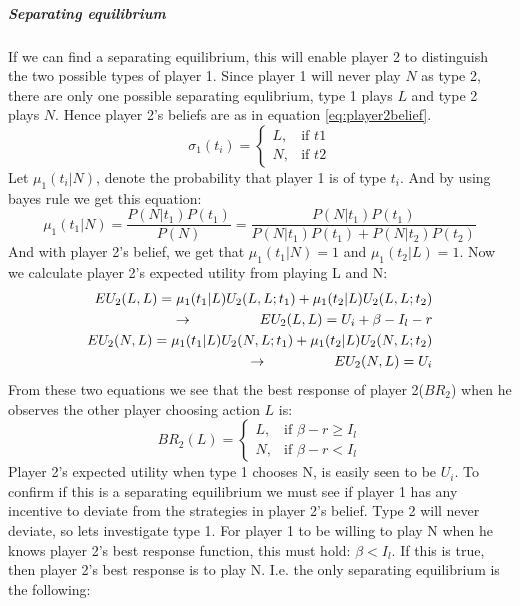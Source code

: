 \subparagraph{Separating equilibrium}
If we can find a separating equilibrium, this will enable player 2 to distinguish the two possible types of player 1.
Since player 1 will never play $N$ as type 2, there are only one possible separating equlibrium, type 1 plays $L$ and type 2 plays $N$. Hence player 2's beliefs are as in equation \ref{eq:player2belief}.
\begin{equation}
    \sigma_{1}(t_{i})= 
\begin{cases}
   L,& \text{if } t1\\
   N,& \text{if } t2  
\end{cases}
\label{eq:player2belief}
\end{equation}
Let $\mu_{1}(t_{i} | N )$, denote the probability that player 1 is of type $t_{i}$. And by using bayes rule we get this equation:
\begin{equation}
\mu_{1}(t_{1} | N )=\frac{P(N|t_{1})P(t_{1})}{P(N)}=\frac{P(N|t_{1})P(t_{1})}{P(N|t_{1})P(t_{1})+P(N|t_{2})P(t_{2})}
\end{equation}
And with player 2's belief, we get that $\mu_{1}(t_{1} | N )=1$ and $\mu_{1}(t_{2} | L )= 1 $. Now we calculate player 2's expected utility from playing L and N:
\begin{eqnarray}
EU_{2}(L,L)=\mu_{1}(t_{1} | L )U_{2}(L,L;t_{1})+\mu_{1}(t_{2} | L )U_{2}(L,L;t_{2}) \nonumber\\
\llap{$\rightarrow$\hspace{50pt}}EU_{2}(L,L)=U_{i}+\beta-I_{l}-r \\
EU_{2}(N,L)=\mu_{1}(t_{1} | L )U_{2}(N,L;t_{1})+\mu_{1}(t_{2} | L )U_{2}(N,L;t_{2})\nonumber\\
\llap{$\rightarrow$\hspace{50pt}}EU_{2}(N,L)=U_{i}
\end{eqnarray}
From these two equations we see that the best response of player 2($BR_2$) when he observes the other player choosing action $L$ is:
\begin{equation}
BR_{2}(L)=
\begin{cases}
L, & \text{if }\beta - r \geq I_{l}\\
N, & \text{if } \beta -r<I_{l}
\end{cases}
\label{eq:insuredBR}
\end{equation}
Player 2's expected utility when type 1 chooses N, is easily seen to be $U_{i}$. 
To confirm if this is a separating equilibrium we must see if player 1 has any incentive to deviate from the strategies in player 2's belief.
Type 2 will never deviate, so lets investigate type 1.
For player 1 to be willing to play N when he knows player 2's best response function, this must hold: $\beta<I_{l}$. If this is true, then player 2's best response is to play N. I.e. the only separating equilibrium is the following:

